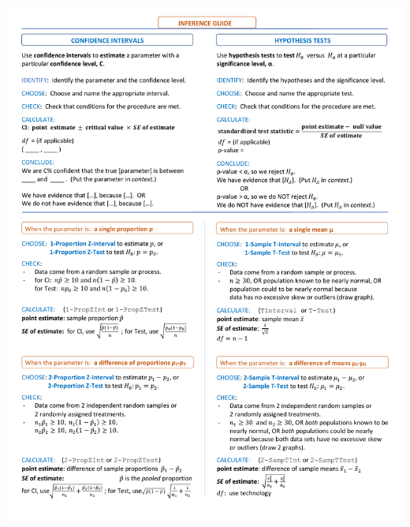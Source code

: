 
\begin{center}
\includegraphics[height=10in]{extraTeX/inferenceGuide/figures/inference_guide1}
\textA{\newpage}

\end{center}
